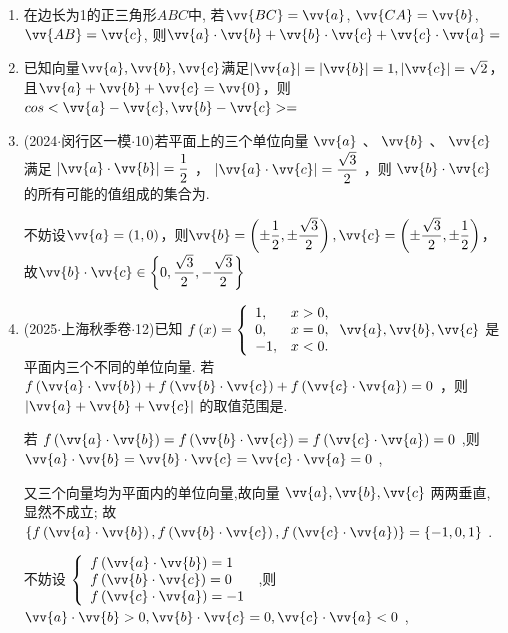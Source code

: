 \begin{enumerate}
    \item 在边长为1的正三角形$ABC$中, 若$\vv{BC}=\vv{a}$, $\vv{CA}=\vv{b}$, $\vv{AB}=\vv{c}$, 则$\vv{a}\cdot\vv{b}+\vv{b}\cdot\vv{c}+\vv{c}\cdot\vv{a}=$
    \item 已知向量$\vv{a}, \vv{b}, \vv{c}$满足$|\vv{a}| = |\vv{b}| = 1, |\vv{c}| = \sqrt{2}$，且$\vv{a} + \vv{b} + \vv{c} = \vv{0}$，则$cos<\vv{a} - \vv{c}, \vv{b} - \vv{c}> = $ 
    \item (2024$\cdot$闵行区一模$\cdot$10)若平面上的三个单位向量 $\vv{a}$ 、 $\vv{b}$ 、 $\vv{c}$ 满足 $\left| {\vv{a} \cdot  \vv{b}}\right|  = \dfrac{1}{2}$ ， $\left| {\vv{a} \cdot  \vv{c}}\right|  = \dfrac{\sqrt{3}}{2}$ ，则 $\vv{b} \cdot  \vv{c}$ 的所有可能的值组成的集合为.
    \begin{jieda}
        不妨设$\vv{a} = (1, 0)$，则$\vv{b} = \left(\pm \dfrac{1}{2}, \pm \dfrac{\sqrt{3}}{2}\right), \vv{c} = \left(\pm \dfrac{\sqrt{3}}{2}, \pm \dfrac{1}{2}\right)$，故$\vv{b} \cdot  \vv{c} \in \left\{  {0,\dfrac{\sqrt{3}}{2}, - \dfrac{\sqrt{3}}{2}}\right\}$
    \end{jieda}
    \item (2025$\cdot$上海秋季卷$\cdot$12)已知 $f\left( x\right)  = \left\{  \begin{array}{ll} 1,&x > 0, \\  0,&x = 0, \\   - 1,&x < 0. \end{array}\right. \vv{a},\vv{b},\vv{c}$ 是平面内三个不同的单位向量. 若 $f\left( {\vv{a} \cdot  \vv{b}}\right)  + f\left( {\vv{b} \cdot  \vv{c}}\right)  + f\left( {\vv{c} \cdot  \vv{a}}\right)  = 0$ ，则 $\left| {\vv{a} + \vv{b} + \vv{c}}\right|$ 的取值范围是.
    \begin{jieda}
        若 $f\left( {\vv{a} \cdot  \vv{b}}\right)  = f\left( {\vv{b} \cdot  \vv{c}}\right)  = f\left( {\vv{c} \cdot  \vv{a}}\right)  = 0$ ,则 $\vv{a} \cdot  \vv{b} = \vv{b} \cdot  \vv{c} = \vv{c} \cdot  \vv{a} = 0$ ,
        
        又三个向量均为平面内的单位向量,故向量 $\vv{a},\vv{b},\vv{c}$ 两两垂直,显然不成立; 故 $\left\{  {f\left( {\vv{a} \cdot  \vv{b}}\right) ,f\left( {\vv{b} \cdot  \vv{c}}\right) ,f\left( {\vv{c} \cdot  \vv{a}}\right) }\right\}   = \{  - 1,0,1\}$ .
        
        不妨设 $\left\{  \begin{array}{l} f\left( {\vv{a} \cdot  \vv{b}}\right)  = 1 \\  f\left( {\vv{b} \cdot  \vv{c}}\right)  = 0 \\  f\left( {\vv{c} \cdot  \vv{a}}\right)  =  - 1 \end{array}\right.$ ,则 $\vv{a} \cdot  \vv{b} > 0,\vv{b} \cdot  \vv{c} = 0,\vv{c} \cdot  \vv{a} < 0$ ,
        

\end{jieda}
\end{enumerate}
